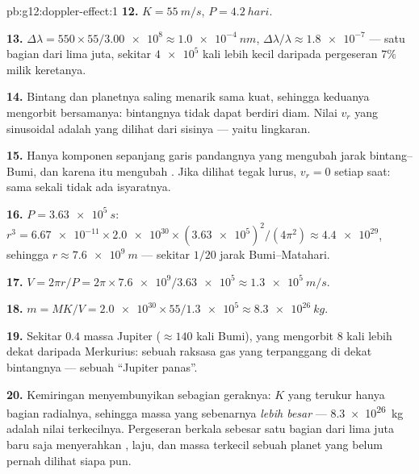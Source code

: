 \begin{solution}{pb:g12:doppler-effect:1}
\textbf{12.} $K = \qty{55}{m/s}$, $P = \qty{4.2}{hari}$.

\textbf{13.} $\Delta\lambda = 550 \times 55/\num{3.00e8} \approx \qty{1.0e-4}{nm}$,
$\Delta\lambda/\lambda \approx \num{1.8e-7}$ --- satu bagian dari lima juta, sekitar
$\num{4e5}$ kali lebih kecil daripada pergeseran $7\%$ milik keretanya.

\textbf{14.} Bintang dan planetnya saling menarik sama kuat, sehingga keduanya mengorbit
 bersamanya: bintangnya tidak dapat berdiri diam. Nilai $v_r$ yang sinusoidal
adalah  yang dilihat dari sisinya --- yaitu  lingkaran.

\textbf{15.} Hanya komponen sepanjang garis pandangnya yang mengubah jarak
bintang--Bumi, dan karena itu mengubah . Jika dilihat tegak lurus,
$v_r = 0$ setiap saat: sama sekali tidak ada isyaratnya.

\textbf{16.} $P = \qty{3.63e5}{s}$: $r^3 = \num{6.67e-11} \times \num{2.0e30} \times
(\num{3.63e5})^2/(4\pi^2) \approx \num{4.4e29}$, sehingga $r \approx \qty{7.6e9}{m}$ ---
sekitar $1/20$ jarak Bumi--Matahari.

\textbf{17.} $V = 2\pi r/P = 2\pi \times \num{7.6e9}/\num{3.63e5} \approx
\qty{1.3e5}{m/s}$.

\textbf{18.} $m = M K/V = \num{2.0e30} \times 55/\num{1.3e5} \approx \qty{8.3e26}{kg}$.

\textbf{19.} Sekitar $0.4$ massa Jupiter ($\approx 140$ kali Bumi), yang mengorbit $8$ kali
lebih dekat daripada Merkurius: sebuah raksasa gas yang terpanggang di dekat bintangnya ---
sebuah ``Jupiter panas''.

\textbf{20.} Kemiringan menyembunyikan sebagian geraknya: $K$ yang terukur hanya bagian
radialnya, sehingga massa yang sebenarnya \emph{lebih besar} --- \qty{8.3e26}{kg} adalah
nilai terkecilnya. Pergeseran berkala sebesar satu bagian dari lima juta baru saja
menyerahkan , laju, dan massa terkecil sebuah planet yang belum pernah dilihat siapa
pun.
\end{solution}
